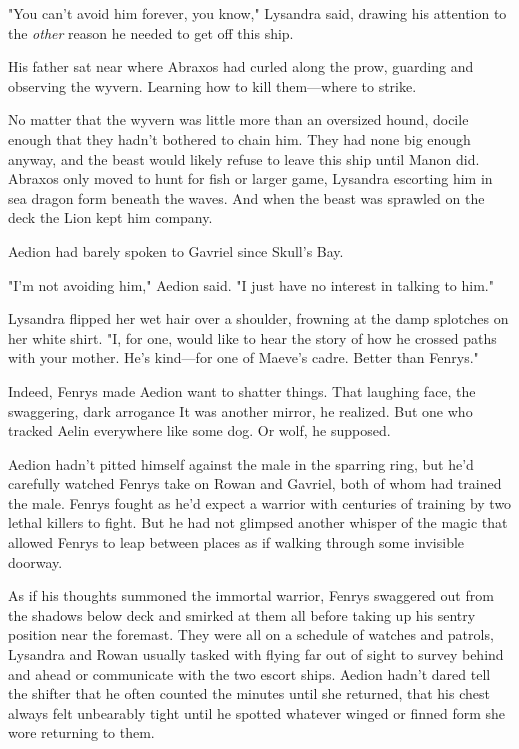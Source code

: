 "You can't avoid him forever, you know," Lysandra said, drawing his attention to the \emph{other} reason he needed to get off this ship.

His father sat near where Abraxos had curled along the prow, guarding and observing the wyvern. Learning how to kill them---where to strike.

No matter that the wyvern was little more than an oversized hound, docile enough that they hadn't bothered to chain him. They had none big enough anyway, and the beast would likely refuse to leave this ship until Manon did. Abraxos only moved to hunt for fish or larger game, Lysandra escorting him in sea dragon form beneath the waves. And when the beast was sprawled on the deck  the Lion kept him company.

Aedion had barely spoken to Gavriel since Skull's Bay.

"I'm not avoiding him," Aedion said. "I just have no interest in talking to him."

Lysandra flipped her wet hair over a shoulder, frowning at the damp splotches on her white shirt. "I, for one, would like to hear the story of how he crossed paths with your mother. He's kind---for one of Maeve's cadre. Better than Fenrys."

Indeed, Fenrys made Aedion want to shatter things. That laughing face, the swaggering, dark arrogance  It was another mirror, he realized. But one who tracked Aelin everywhere like some dog. Or wolf, he supposed.

Aedion hadn't pitted himself against the male in the sparring ring, but he'd carefully watched Fenrys take on Rowan and Gavriel, both of whom had trained the male. Fenrys fought as he'd expect a warrior with centuries of training by two lethal killers to fight. But he had not glimpsed another whisper of the magic that allowed Fenrys to leap between places as if walking through some invisible doorway.

As if his thoughts summoned the immortal warrior, Fenrys swaggered out from the shadows below deck and smirked at them all before taking up his sentry position near the foremast. They were all on a schedule of watches and patrols, Lysandra and Rowan usually tasked with flying far out of sight to survey behind and ahead or communicate with the two escort ships. Aedion hadn't dared tell the shifter that he often counted the minutes until she returned, that his chest always felt unbearably tight until he spotted whatever winged or finned form she wore returning to them.

